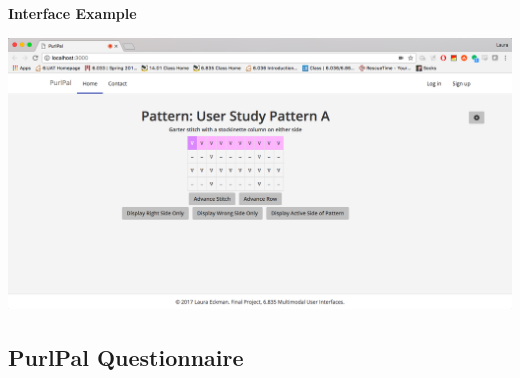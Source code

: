\documentclass{article}
\begin{document}
\medskip

\textbf{Interface Example} \label{responsive}

\includegraphics[width=6in]{responsive_pattern_A}

\subsection{PurlPal Questionnaire} \label{questionnaire}
\end{document}
